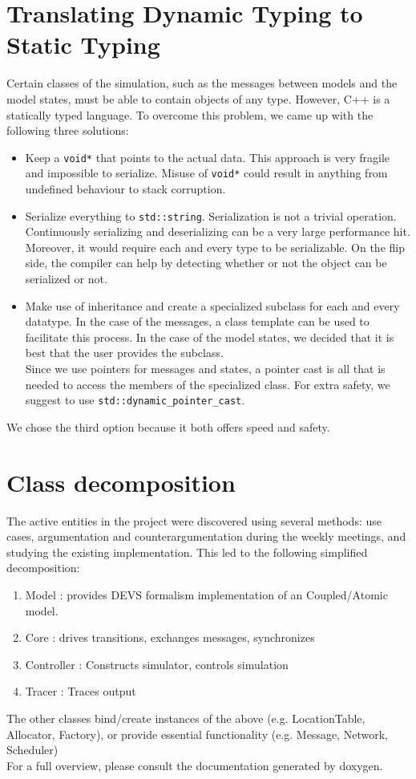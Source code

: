 \documentclass[8pt,a4paper]{report}
\begin{document}
\section{Translating Dynamic Typing to Static Typing}
Certain classes of the simulation, such as the messages between models and the model states, must be able to contain objects of any type. However, C++ is a statically typed language. To overcome this problem, we came up with the following three solutions:
\begin{itemize}
	\item Keep a \texttt{void*} that points to the actual data. This approach is very fragile and impossible to serialize. Misuse of \texttt{void*} could result in anything from undefined behaviour to stack corruption.
	\item Serialize everything to \texttt{std::string}. Serialization is not a trivial operation. Continuously serializing and deserializing can be a very large performance hit. Moreover, it would require each and every type to be serializable. On the flip side, the compiler can help by detecting whether or not the object can be serialized or not.
	\item Make use of inheritance and create a specialized subclass for each and every datatype. In the case of the messages, a class template can be used to facilitate this process. In the case of the model states, we decided that it is best that the user provides the subclass.\\
	Since we use pointers for messages and states, a pointer cast is all that is needed to access the members of the specialized class. For extra safety, we suggest to use \texttt{std::dynamic\_pointer\_cast}.
\end{itemize}
We chose the third option because it both offers speed and safety.

\section{Class decomposition}
The active entities in the project were discovered using several methods: use cases, argumentation and counterargumentation during the weekly meetings, and studying the existing implementation. This led to the following simplified decomposition:
\begin{enumerate}
\item Model : provides DEVS formalism implementation of an Coupled/Atomic model.
\item Core : drives transitions, exchanges messages, synchronizes
\item Controller : Constructs simulator, controls simulation
\item Tracer : Traces output
\end{enumerate}
The other classes bind/create instances of the above (e.g. LocationTable, Allocator, Factory), or provide essential functionality (e.g. Message, Network, Scheduler)\\
For a full overview, please consult the documentation generated by doxygen.
\end{document}
